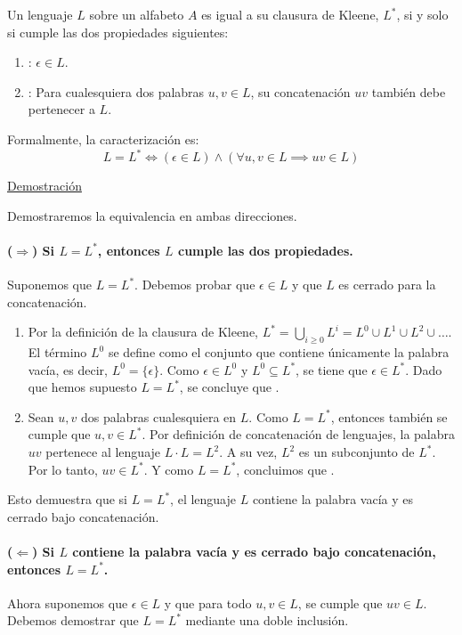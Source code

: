\documentclass[12pt]{book} %
\begin{document}
\begin{solucion}
Un lenguaje $L$ sobre un alfabeto $A$ es igual a su clausura de Kleene, $L^*$, si y solo si cumple las dos propiedades siguientes:

\begin{enumerate}
    \item {}: $\epsilon \in L$.
    \item {}: Para cualesquiera dos palabras $u, v \in L$, su concatenación $uv$ también debe pertenecer a $L$.
\end{enumerate}

Formalmente, la caracterización es:
\[ L = L^* \iff (\epsilon \in L) \land (\forall u, v \in L \implies uv \in L) \]

\underline{Demostración}

Demostraremos la equivalencia en ambas direcciones.

\paragraph{($\Rightarrow$) Si $L = L^*$, entonces $L$ cumple las dos propiedades.}
Suponemos que $L = L^*$. Debemos probar que $\epsilon \in L$ y que $L$ es cerrado para la concatenación.
\begin{enumerate}
    \item Por la definición de la clausura de Kleene, $L^* = \bigcup_{i \ge 0} L^i = L^0 \cup L^1 \cup L^2 \cup \dots$. El término $L^0$ se define como el conjunto que contiene únicamente la palabra vacía, es decir, $L^0 = \{\epsilon\}$. Como $\epsilon \in L^0$ y $L^0 \subseteq L^*$, se tiene que $\epsilon \in L^*$. Dado que hemos supuesto $L=L^*$, se concluye que .

    \item Sean $u, v$ dos palabras cualesquiera en $L$. Como $L = L^*$, entonces también se cumple que $u, v \in L^*$. Por definición de concatenación de lenguajes, la palabra $uv$ pertenece al lenguaje $L \cdot L = L^2$. A su vez, $L^2$ es un subconjunto de $L^*$. Por lo tanto, $uv \in L^*$. Y como $L=L^*$, concluimos que .
\end{enumerate}
Esto demuestra que si $L = L^*$, el lenguaje $L$ contiene la palabra vacía y es cerrado bajo concatenación.

\paragraph{($\Leftarrow$) Si $L$ contiene la palabra vacía y es cerrado bajo concatenación, entonces $L = L^*$.}
Ahora suponemos que $\epsilon \in L$ y que para todo $u, v \in L$, se cumple que $uv \in L$. Debemos demostrar que $L = L^*$ mediante una doble inclusión.


\end{solucion}
\end{document}
